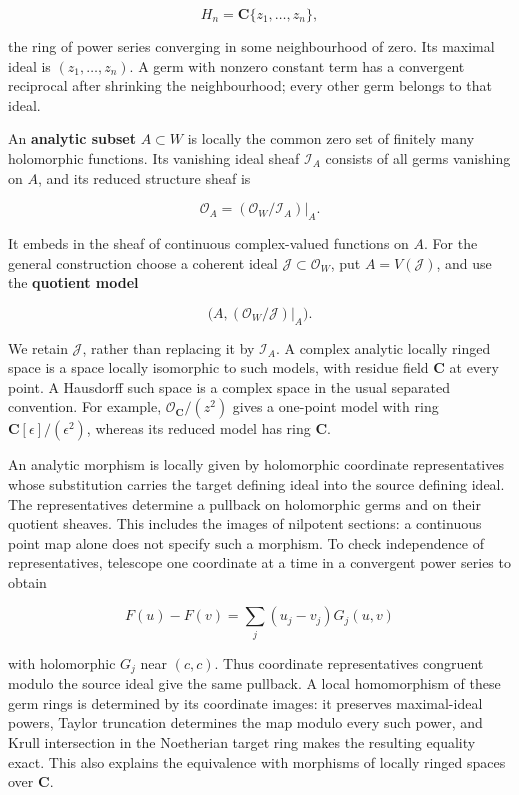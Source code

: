 \documentclass[11pt]{article}
\begin{document}
\[
H_n=\mathbf C\{z_1,\ldots,z_n\},
\]

the ring of power series converging in some neighbourhood of zero. Its
maximal ideal is \((z_1,\ldots,z_n)\). A germ with nonzero constant term
has a convergent reciprocal after shrinking the neighbourhood; every
other germ belongs to that ideal.

An \textbf{analytic subset} \(A\subset W\) is locally the common zero
set of finitely many holomorphic functions. Its vanishing ideal sheaf
\(\mathcal I_A\) consists of all germs vanishing on \(A\), and its
reduced structure sheaf is

\[
\mathcal O_A=(\mathcal O_W/\mathcal I_A)|_A.
\]

It embeds in the sheaf of continuous complex-valued functions on \(A\).
For the general construction choose a coherent ideal
\(\mathcal J\subset\mathcal O_W\), put \(A=V(\mathcal J)\), and use the
\textbf{quotient model}

\[
\bigl(A,(\mathcal O_W/\mathcal J)|_A\bigr).
\]

We retain \(\mathcal J\), rather than replacing it by \(\mathcal I_A\).
A complex analytic locally ringed space is a space locally isomorphic to
such models, with residue field \(\mathbf C\) at every point. A
Hausdorff such space is a complex space in the usual separated
convention. For example, \(\mathcal O_{\mathbf C}/(z^2)\) gives a
one-point model with ring \(\mathbf C[\epsilon]/(\epsilon^2)\), whereas
its reduced model has ring \(\mathbf C\).

An analytic morphism is locally given by holomorphic coordinate
representatives whose substitution carries the target defining ideal
into the source defining ideal. The representatives determine a pullback
on holomorphic germs and on their quotient sheaves. This includes the
images of nilpotent sections: a continuous point map alone does not
specify such a morphism. To check independence of representatives,
telescope one coordinate at a time in a convergent power series to
obtain

\[
F(u)-F(v)=\sum_j(u_j-v_j)G_j(u,v)
\]

with holomorphic \(G_j\) near \((c,c)\). Thus coordinate representatives
congruent modulo the source ideal give the same pullback. A local
homomorphism of these germ rings is determined by its coordinate images:
it preserves maximal-ideal powers, Taylor truncation determines the map
modulo every such power, and Krull intersection in the Noetherian target
ring makes the resulting equality exact. This also explains the
equivalence with morphisms of locally ringed spaces over \(\mathbf C\).
\end{document}
